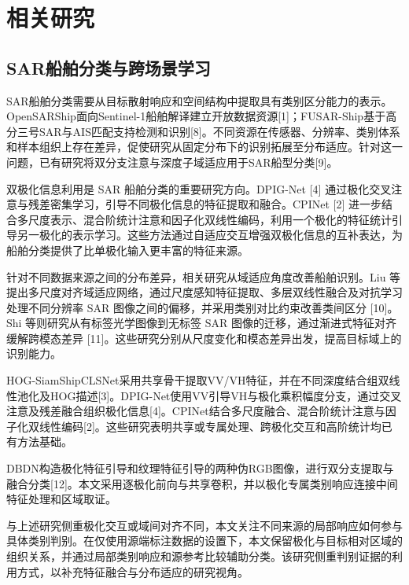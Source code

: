 \documentclass[journal,10pt,a4paper]{IEEEtran}
\begin{document}
\section{相关研究}\label{ux76f8ux5173ux7814ux7a76}

\subsection{SAR船舶分类与跨场景学习}\label{sarux8239ux8236ux5206ux7c7bux4e0eux8de8ux573aux666fux5b66ux4e60}

SAR船舶分类需要从目标散射响应和空间结构中提取具有类别区分能力的表示。OpenSARShip面向Sentinel-1船舶解译建立开放数据资源{[}1{]}；FUSAR-Ship基于高分三号SAR与AIS匹配支持检测和识别{[}8{]}。不同资源在传感器、分辨率、类别体系和样本组织上存在差异，促使研究从固定分布下的识别拓展至分布适应。针对这一问题，已有研究将双分支注意与深度子域适应用于SAR船型分类{[}9{]}。

双极化信息利用是 SAR 船舶分类的重要研究方向。DPIG-Net {[}4{]} 通过极化交叉注意与残差密集学习，引导不同极化信息的特征提取和融合。CPINet {[}2{]} 进一步结合多尺度表示、混合阶统计注意和因子化双线性编码，利用一个极化的特征统计引导另一极化的表示学习。这些方法通过自适应交互增强双极化信息的互补表达，为船舶分类提供了比单极化输入更丰富的特征来源。

针对不同数据来源之间的分布差异，相关研究从域适应角度改善船舶识别。Liu 等提出多尺度对齐域适应网络，通过尺度感知特征提取、多层双线性融合及对抗学习处理不同分辨率 SAR 图像之间的偏移，并采用类别对比约束改善类间区分 {[}10{]}。Shi 等则研究从有标签光学图像到无标签 SAR 图像的迁移，通过渐进式特征对齐缓解跨模态差异 {[}11{]}。这些研究分别从尺度变化和模态差异出发，提高目标域上的识别能力。

HOG-SiamShipCLSNet采用共享骨干提取VV/VH特征，并在不同深度结合组双线性池化及HOG描述{[}3{]}。DPIG-Net使用VV引导VH与极化乘积幅度分支，通过交叉注意及残差融合组织极化信息{[}4{]}。CPINet结合多尺度融合、混合阶统计注意与因子化双线性编码{[}2{]}。这些研究表明共享或专属处理、跨极化交互和高阶统计均已有方法基础。

DBDN构造极化特征引导和纹理特征引导的两种伪RGB图像，进行双分支提取与融合分类{[}12{]}。本文采用逐极化前向与共享卷积，并以极化专属类别响应连接中间特征处理和区域取证。

与上述研究侧重极化交互或域间对齐不同，本文关注不同来源的局部响应如何参与具体类别判别。在仅使用源端标注数据的设置下，本文保留极化与目标相对区域的组织关系，并通过局部类别响应和源参考比较辅助分类。该研究侧重判别证据的利用方式，以补充特征融合与分布适应的研究视角。
\end{document}
